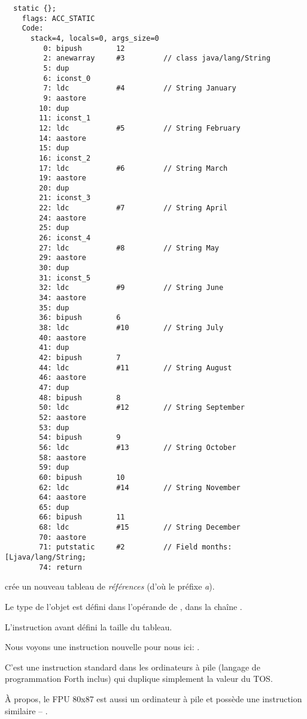 \begin{lstlisting}
  static {};
    flags: ACC_STATIC
    Code:
      stack=4, locals=0, args_size=0
         0: bipush        12
         2: anewarray     #3         // class java/lang/String
         5: dup
         6: iconst_0
         7: ldc           #4         // String January
         9: aastore
        10: dup
        11: iconst_1
        12: ldc           #5         // String February
        14: aastore
        15: dup
        16: iconst_2
        17: ldc           #6         // String March
        19: aastore
        20: dup
        21: iconst_3
        22: ldc           #7         // String April
        24: aastore
        25: dup
        26: iconst_4
        27: ldc           #8         // String May
        29: aastore
        30: dup
        31: iconst_5
        32: ldc           #9         // String June
        34: aastore
        35: dup
        36: bipush        6
        38: ldc           #10        // String July
        40: aastore
        41: dup
        42: bipush        7
        44: ldc           #11        // String August
        46: aastore
        47: dup
        48: bipush        8
        50: ldc           #12        // String September
        52: aastore
        53: dup
        54: bipush        9
        56: ldc           #13        // String October
        58: aastore
        59: dup
        60: bipush        10
        62: ldc           #14        // String November
        64: aastore
        65: dup
        66: bipush        11
        68: ldc           #15        // String December
        70: aastore
        71: putstatic     #2         // Field months:[Ljava/lang/String;
        74: return
\end{lstlisting}

 crée un nouveau tableau de \emph{références} (d'où le préfixe \emph{a}).

Le type de l'objet est défini dans l'opérande de , dans la chaîne .

L'instruction  avant  défini la taille du tableau.

Nous voyons une instruction nouvelle pour nous ici: .

C'est une instruction standard dans les ordinateurs à pile (langage de programmation
Forth inclus) qui duplique simplement la valeur du \ac{TOS}.

À propos, le FPU 80x87 est aussi un ordinateur à pile et possède une instruction
similaire -- .

